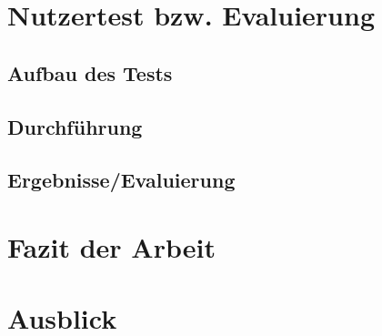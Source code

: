 \section{Nutzertest bzw. Evaluierung}
\subsection{Aufbau des Tests}
\subsection{Durchführung}
\subsection{Ergebnisse/Evaluierung}

\section{Fazit der Arbeit}
\section{Ausblick}